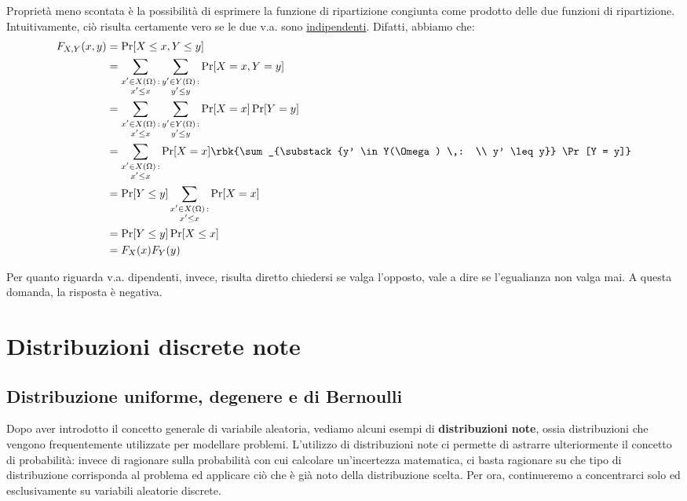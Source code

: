 \documentclass[a4paper, 12pt]{report}
\begin{document}
    Proprietà meno scontata è la possibilità di esprimere la funzione di ripartizione congiunta come prodotto delle due funzioni di ripartizione. Intuitivamente, ciò risulta certamente vero se le due v.a. sono \underline{indipendenti}. Difatti, abbiamo che:
    \[\begin{split}
        F_{X,Y}(x,y) &= \Pr[X \leq x, Y \leq y]\\
        &= \sum_{\substack{x' \in X(\Omega) \,: \\ x' \leq x}}  \sum_{\substack{y' \in Y(\Omega) \,: \\ y' \leq y}} \Pr[X = x, Y = y] \\
        &= \sum_{\substack{x' \in X(\Omega) \,: \\ x' \leq x}}  \sum_{\substack{y' \in Y(\Omega) \,: \\ y' \leq y}} \Pr[X = x] \Pr[Y = y] \\
        &= \sum_{\substack{x' \in X(\Omega) \,: \\ x' \leq x}} \Pr[X = x] \rbk{\sum_{\substack{y' \in Y(\Omega) \,: \\ y' \leq y}}  \Pr[Y = y]} \\
        &= \Pr[Y \leq y] \sum_{\substack{x' \in X(\Omega) \,: \\ x' \leq x}} \Pr[X = x] \\
        &= \Pr[Y \leq y] \Pr[X \leq x] \\
        &= F_X(x) F_Y(y) \\
    \end{split}\]

    Per quanto riguarda v.a. dipendenti, invece, risulta diretto chiedersi se valga l'opposto, vale a dire se l'egualianza non valga mai. A questa domanda, la risposta è negativa.

    \section{Distribuzioni discrete note}

    \subsection{Distribuzione uniforme, degenere e di Bernoulli}

    Dopo aver introdotto il concetto generale di variabile aleatoria, vediamo alcuni esempi di \textbf{distribuzioni note}, ossia distribuzioni che vengono frequentemente utilizzate per modellare problemi. L'utilizzo di distribuzioni note ci permette di astrarre ulteriormente il concetto di probabilità: invece di ragionare sulla probabilità con cui calcolare un'incertezza matematica, ci basta ragionare su che tipo di distribuzione corrisponda al problema ed applicare ciò che è già noto della distribuzione scelta. Per ora, continueremo a concentrarci solo ed esclusivamente su variabili aleatorie discrete.
\end{document}
